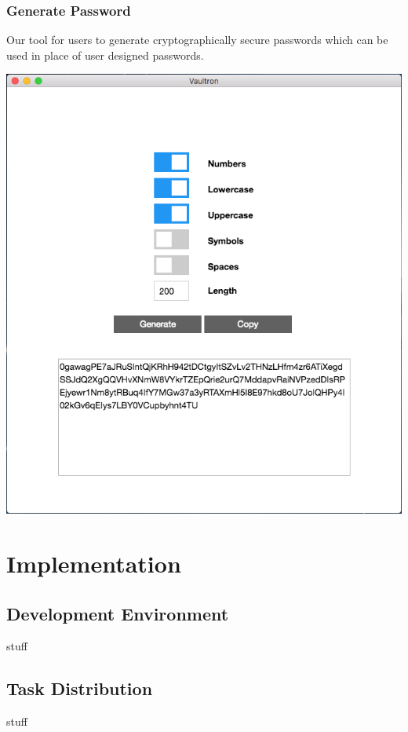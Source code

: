 \documentclass[11pt]{report}
\begin{document}
\subsection{Generate Password}
Our tool for users to generate cryptographically secure passwords which can be
used in place of user designed passwords.
\begin{center}
\includegraphics[scale=0.40]{app-passgen-demo.png}
\end{center}


\chapter{Implementation}

\section{Development Environment}
stuff

\section{Task Distribution}
stuff
\end{document}
